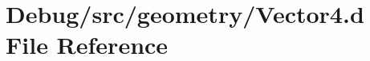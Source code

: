 \hypertarget{_vector4_8d}{}\section{Debug/src/geometry/\+Vector4.d File Reference}
\label{_vector4_8d}
